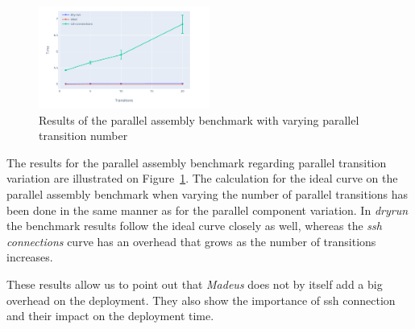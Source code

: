 \begin{figure}[h]
  \begin{center} 
    \includegraphics[width=0.5\textwidth]{./images/evaluations_par_transitions.pdf}
    \caption{Results of the parallel assembly benchmark with varying parallel transition number}
    \label{fig:partrans}
  \end{center}
\end{figure}

The results for the parallel assembly benchmark regarding parallel
transition variation are illustrated on Figure~\ref{fig:partrans}. The
calculation for the ideal curve on the parallel assembly benchmark
when varying the number of parallel transitions has been done in the
same manner as for the parallel component variation. In \emph{dryrun}
the benchmark results follow the ideal curve closely as well, whereas
the \emph{ssh connections} curve has an overhead that grows as the
number of transitions increases.

These results allow us to point out that \emph{Madeus} does not by
itself add a big overhead on the deployment. They also show the
importance of ssh connection and their impact on the deployment time.

